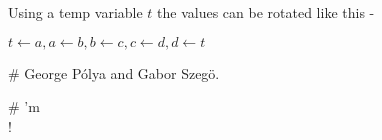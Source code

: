 \documentclass[24pt]{article}
\begin{document}
\begin{enumerate}
\begin{item}
Using a temp variable $t$ the values can be rotated like this -

$ t \leftarrow a, a \leftarrow b, b \leftarrow c, c \leftarrow d, d \leftarrow t $ 
\end{item}


# George P\'olya and Gabor Szeg\"o.

# \I'm \\!

\begin{item}
  
\end{item}



\end{enumerate}
\end{document}
